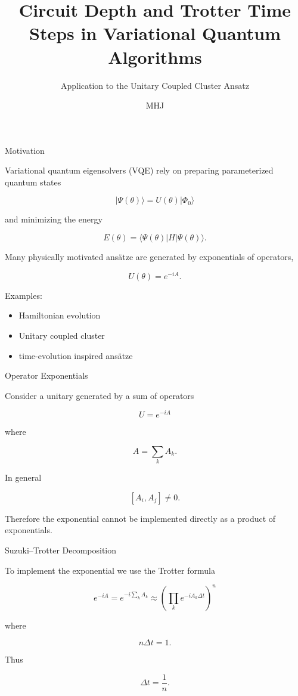 \documentclass{beamer}
\title{Circuit Depth and Trotter Time Steps in Variational Quantum Algorithms}
\subtitle{Application to the Unitary Coupled Cluster Ansatz}
\author{MHJ}
\date{}
\begin{document}
\frame{\titlepage}

\begin{frame}{Motivation}

Variational quantum eigensolvers (VQE) rely on preparing
parameterized quantum states

\[
|\Psi(\theta)\rangle = U(\theta)|\Phi_0\rangle
\]

and minimizing the energy

\[
E(\theta) = \langle \Psi(\theta)|H|\Psi(\theta)\rangle.
\]

Many physically motivated ansätze are generated by
exponentials of operators,

\[
U(\theta) = e^{-iA}.
\]

Examples:

\begin{itemize}
\item Hamiltonian evolution
\item Unitary coupled cluster
\item time-evolution inspired ansätze
\end{itemize}

\end{frame}

\begin{frame}{Operator Exponentials}

Consider a unitary generated by a sum of operators

\[
U = e^{-iA}
\]

where

\[
A = \sum_k A_k .
\]

In general

\[
[A_i , A_j] \neq 0.
\]

Therefore the exponential cannot be implemented directly
as a product of exponentials.

\end{frame}

\begin{frame}{Suzuki–Trotter Decomposition}

To implement the exponential we use the Trotter formula

\[
e^{-iA} =
e^{-i\sum_k A_k}
\approx
\left(
\prod_k e^{-i A_k \Delta t}
\right)^n
\]

where

\[
n\Delta t = 1.
\]

Thus

\[
\Delta t = \frac{1}{n}.
\]

\end{frame}
\end{document}

